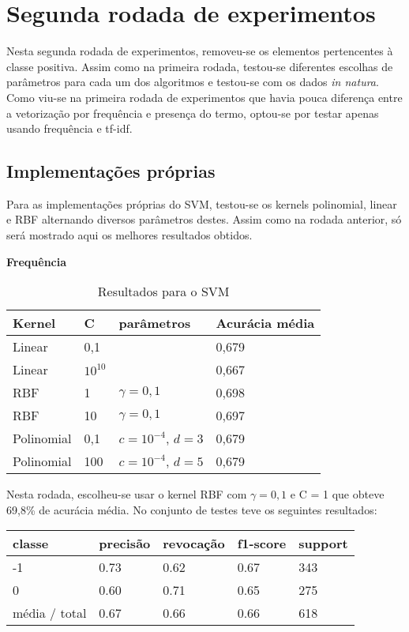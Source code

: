 \section{Segunda rodada de experimentos}

Nesta segunda rodada de experimentos, removeu-se os elementos pertencentes à classe positiva.
Assim como na primeira rodada, testou-se diferentes escolhas de parâmetros para cada um dos
algoritmos e testou-se com os dados \textit{in natura}. Como viu-se na primeira rodada de experimentos
que havia pouca diferença entre a vetorização por frequência e presença do termo, optou-se por testar
apenas usando frequência e tf-idf.

\subsection{Implementações próprias}

Para as implementações próprias do SVM, testou-se os kernels polinomial, linear e RBF alternando
diversos parâmetros destes. Assim como na rodada anterior, só será mostrado aqui os melhores resultados
obtidos. 

\textbf{Frequência}

\begin{table}[H]
	\centering
	\caption{Resultados para o SVM}
	\begin{tabular}{l l l l}
		\hline
		Kernel & C & parâmetros & Acurácia média \\
		\hline
		Linear & 0,1 & & 0,679 \\
		\hline
		Linear & $10^{10}$ & & 0,667 \\
		\hline
		RBF & 1 & $\gamma = 0,1$ & 0,698 \\
		\hline
		RBF & 10 & $\gamma = 0,1$ & 0,697 \\
		\hline
		Polinomial & 0,1 & $c = 10^{-4}$, $d = 3$ & 0,679 \\
		\hline
		Polinomial & 100 & $c = 10^{-4}$, $d = 5$ & 0,679 \\
		\hline
	\end{tabular}
\end{table}

Nesta rodada, escolheu-se usar o kernel RBF com $\gamma = 0,1$ e C = 1 que obteve 69,8\% de acurácia média. No
conjunto de testes teve os seguintes resultados:

\begin{table}[H]
	\centering
		\begin{tabular}{l | l | l | l | l}
		\hline
		classe  	&	precisão  &  revocação &  f1-score &  support \\
		\hline
		 -1    &   0.73   &   0.62   &   0.67   &    343 \\
		 \hline
          0    &   0.60   &   0.71   &   0.65   &    275 \\
		\hline
		média / total   &    0.67   &   0.66   &   0.66   &    618 \\
		\hline
	\end{tabular}
\end{table}


